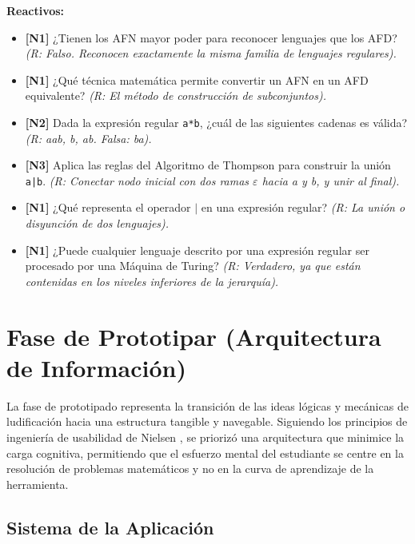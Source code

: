 \textbf{Reactivos:}
\begin{itemize}
    \item \textbf{[N1]} ¿Tienen los AFN mayor poder para reconocer lenguajes que los AFD?
    \textit{(R: Falso. Reconocen exactamente la misma familia de lenguajes regulares).}
    \item \textbf{[N1]} ¿Qué técnica matemática permite convertir un AFN en un AFD equivalente?
    \textit{(R: El método de construcción de subconjuntos).}
    \item \textbf{[N2]} Dada la expresión regular \texttt{a*b}, ¿cuál de las siguientes cadenas es
    válida? \textit{(R: aab, b, ab. Falsa: ba).}
    \item \textbf{[N3]} Aplica las reglas del Algoritmo de Thompson para construir la unión
    \texttt{a|b}. \textit{(R: Conectar nodo inicial con dos ramas $\varepsilon$ hacia a y b, y
    unir al final).}
    \item \textbf{[N1]} ¿Qué representa el operador $|$ en una expresión regular? \textit{(R: La
    unión o disyunción de dos lenguajes).}
    \item \textbf{[N1]} ¿Puede cualquier lenguaje descrito por una expresión regular ser procesado
    por una Máquina de Turing? \textit{(R: Verdadero, ya que están contenidas en los niveles
    inferiores de la jerarquía).}
\end{itemize}

\section{Fase de Prototipar (Arquitectura de Información)}
\label{sec:prototipar}

La fase de prototipado representa la transición de las ideas lógicas y mecánicas de ludificación
hacia una estructura tangible y navegable. Siguiendo los principios de ingeniería de usabilidad de
Nielsen \cite{nielsen1994}, se priorizó una arquitectura que minimice la carga cognitiva,
permitiendo que el esfuerzo mental del estudiante se centre en la resolución de problemas
matemáticos y no en la curva de aprendizaje de la herramienta.

\subsection{Sistema de la Aplicación}
\label{subsec:sistema_aplicacion}

